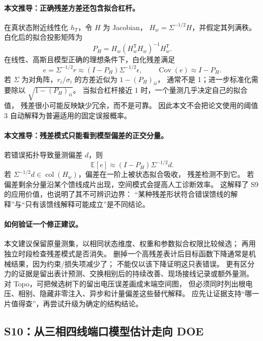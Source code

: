 \documentclass[UTF8,11pt,fontset=fandol]{ctexart}
\theoremstyle{remark}
\numberwithin{equation}{section}
\begin{document}
\paragraph{本文推导：正确残差方差还包含拟合杠杆。}
在真状态附近线性化 $h_T$，令 $H$ 为 Jacobian，
$H_w=\Sigma^{-1/2}H$，并假定其列满秩。
白化后的拟合投影矩阵为
\begin{equation}
 P_H=H_w(H_w^{\mathsf T}H_w)^{-1}H_w^{\mathsf T}.
 \label{eq:eng-s9-projector}
\end{equation}
在线性、高斯且模型正确的理想条件下，白化残差满足
\begin{equation}
 e=\Sigma^{-1/2}r\approx(I-P_H)\Sigma^{-1/2}\epsilon,
 \qquad \operatorname{Cov}(e)\approx I-P_H.
 \label{eq:eng-s9-residual-cov}
\end{equation}
若 $\Sigma$ 为对角阵，$r_i/\sigma_i$ 的方差近似为 $1-(P_H)_{ii}$，
通常不是 1；进一步标准化需要除以 $\sqrt{1-(P_H)_{ii}}$。
当拟合杠杆接近 1 时，一个量测几乎决定自己的拟合值，
残差很小可能反映缺少冗余，而不是可靠。
因此本文不会把论文使用的阈值 3 自动解释为普遍适用的固定误报概率。

\paragraph{本文推导：残差模式只能看到模型偏差的正交分量。}
若错误拓扑导致量测偏差 $d$，则
\begin{equation}
 \mathbb E[e]\approx(I-P_H)\Sigma^{-1/2}d.
 \label{eq:eng-s9-detection}
\end{equation}
若 $\Sigma^{-1/2}d\in\operatorname{col}(H_w)$，偏差在一阶上被状态拟合吸收，
残差检测不到它。
若偏差剩余分量沿某个馈线成片出现，空间模式会提高人工诊断效率。
这解释了 S9 的应用价值，也说明了其不可辨识边界：
“某种残差形状符合错误馈线的解释”与“只有该馈线解释可能成立”是不同结论。

\paragraph{如何验证一个修正建议。}
本文建议保留原量测集，以相同状态维度、权重和参数拟合权限比较候选；
再用独立时段检查残差模式是否消失。
删掉一个高残差表计后目标函数下降通常是机械结果，因为约束/损失项减少了；
不能仅以该下降证明这只表错误。
更有区分力的证据是留出表计预测、交换相别后的持续改善、现场接线记录或额外量测。
对 Topo，可把候选树下的留出电压误差画成末端空间图，
但必须同时列出根电压、相别、隐藏非零注入、异步和计量偏差这些替代解释。
应先让证据支持“哪一片值得查”，再尝试升级为确定的结构结论。

\subsection{S10：从三相四线端口模型估计走向 DOE}
\label{subsec:S10}
\end{document}

